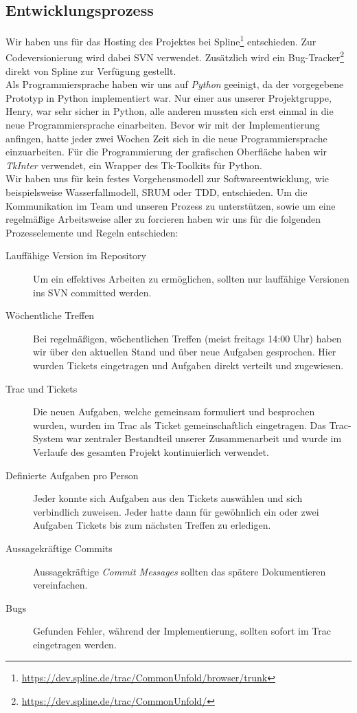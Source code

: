 \subsection{Entwicklungsprozess}
\label{subsec:prozess}

Wir haben uns für das Hosting des Projektes bei Spline\footnote{\url{https://dev.spline.de/trac/CommonUnfold/browser/trunk}} entschieden. Zur Codeversionierung wird dabei SVN verwendet. Zusätzlich wird ein Bug-Tracker\footnote{\url{https://dev.spline.de/trac/CommonUnfold/}} direkt von Spline zur Verfügung gestellt.\\

Als Programmiersprache haben wir uns auf \emph{Python} geeinigt, da der vorgegebene Prototyp in Python implementiert war. Nur einer aus unserer Projektgruppe, Henry, war sehr sicher in Python, alle anderen mussten sich erst einmal in die neue Programmiersprache einarbeiten. Bevor wir mit der Implementierung anfingen, hatte jeder zwei Wochen Zeit sich in die neue Programmiersprache einzuarbeiten. Für die Programmierung der grafischen Oberfläche haben wir \emph{TkInter} verwendet, ein Wrapper des Tk-Toolkits für Python.\\

Wir haben uns für kein festes Vorgehensmodell zur Softwareentwicklung, wie beispielsweise Wasserfallmodell, SRUM oder TDD, entschieden. Um die Kommunikation im Team und unseren Prozess zu unterstützen, sowie um eine regelmäßige Arbeitsweise aller zu forcieren haben wir uns für die folgenden Prozesselemente und Regeln entschieden:

  \begin{description}
    \item[Lauffähige Version im Repository] Um ein effektives Arbeiten zu ermöglichen, sollten nur lauffähige Versionen ins SVN committed werden.
    \item[Wöchentliche Treffen] Bei regelmäßigen, wöchentlichen Treffen (meist freitags 14:00 Uhr) haben wir über den aktuellen Stand und über neue Aufgaben gesprochen. Hier wurden Tickets eingetragen und Aufgaben direkt verteilt und zugewiesen.
    \item[Trac und Tickets] Die neuen Aufgaben, welche gemeinsam formuliert und besprochen wurden, wurden im Trac als Ticket gemeinschaftlich eingetragen. Das Trac-System war zentraler Bestandteil unserer Zusammenarbeit und wurde im Verlaufe des gesamten Projekt kontinuierlich verwendet.
    \item[Definierte Aufgaben pro Person] Jeder konnte sich Aufgaben aus den Tickets auswählen und sich verbindlich zuweisen. Jeder hatte dann für gewöhnlich ein oder zwei Aufgaben \bzw Tickets bis zum nächsten Treffen zu erledigen.
    \item[Aussagekräftige Commits] Aussagekräftige \emph{Commit Messages} sollten das spätere Dokumentieren vereinfachen.
    \item[Bugs] Gefunden Fehler, während der Implementierung, sollten sofort im Trac eingetragen werden. 
  \end{description}

